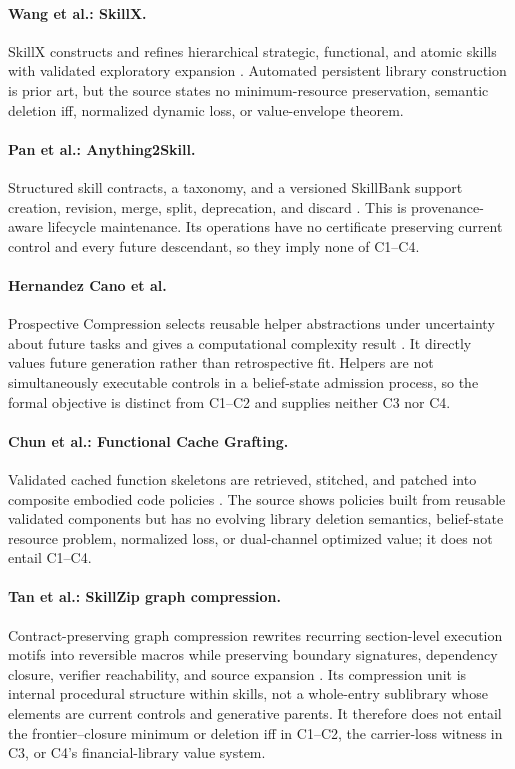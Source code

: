 \paragraph{Wang et al.: SkillX.}
SkillX constructs and refines hierarchical strategic, functional, and
atomic skills with validated exploratory expansion
\cite{WangEtAl2026SkillX}.  Automated persistent library construction is
prior art, but the source states no minimum-resource preservation, semantic
deletion iff, normalized dynamic loss, or value-envelope theorem.

\paragraph{Pan et al.: Anything2Skill.}
Structured skill contracts, a taxonomy, and a versioned SkillBank support
creation, revision, merge, split, deprecation, and discard
\cite{PanEtAl2026Anything2Skill}.  This is provenance-aware lifecycle
maintenance.  Its operations have no certificate preserving current control
and every future descendant, so they imply none of C1--C4.

\paragraph{Hernandez Cano et al.}
Prospective Compression selects reusable helper abstractions under uncertainty
about future tasks and gives a computational complexity result
\cite{HernandezCanoEtAl2026}.  It directly values future generation rather
than retrospective fit.  Helpers are not simultaneously executable controls
in a belief-state admission process, so the formal objective is distinct from
C1--C2 and supplies neither C3 nor C4.

\paragraph{Chun et al.: Functional Cache Grafting.}
Validated cached function skeletons are retrieved, stitched, and patched into
composite embodied code policies \cite{ChunEtAl2026FCGraft}.  The source
shows policies built from reusable validated components but has no evolving
library deletion semantics, belief-state resource problem, normalized loss,
or dual-channel optimized value; it does not entail C1--C4.

\paragraph{Tan et al.: SkillZip graph compression.}
Contract-preserving graph compression rewrites recurring section-level
execution motifs into reversible macros while preserving boundary signatures,
dependency closure, verifier reachability, and source expansion
\cite{TanEtAl2026SkillZipGraph}.  Its compression unit is internal procedural
structure within skills, not a whole-entry sublibrary whose elements are
current controls and generative parents.  It therefore does not entail the
frontier--closure minimum or deletion iff in C1--C2, the carrier-loss witness
in C3, or C4's financial-library value system.

